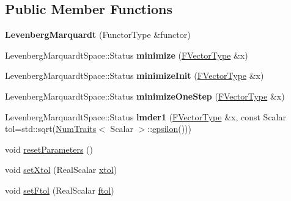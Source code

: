 \subsection*{Public Member Functions}
\begin{DoxyCompactItemize}
\item 
\mbox{\label{class_eigen_1_1_levenberg_marquardt_ac6f47b62a823190b3e28b3eb634e1cca}} 
{\bfseries Levenberg\+Marquardt} (Functor\+Type \&functor)
\item 
\mbox{\label{class_eigen_1_1_levenberg_marquardt_a5c1ef387601af15f7d2474165bb82865}} 
Levenberg\+Marquardt\+Space\+::\+Status {\bfseries minimize} (\hyperlink{group___core___module}{F\+Vector\+Type} \&x)
\item 
\mbox{\label{class_eigen_1_1_levenberg_marquardt_ad1b2467f6143a874e023416db0832810}} 
Levenberg\+Marquardt\+Space\+::\+Status {\bfseries minimize\+Init} (\hyperlink{group___core___module}{F\+Vector\+Type} \&x)
\item 
\mbox{\label{class_eigen_1_1_levenberg_marquardt_a1347316132f0bd7bf2541788d9e12637}} 
Levenberg\+Marquardt\+Space\+::\+Status {\bfseries minimize\+One\+Step} (\hyperlink{group___core___module}{F\+Vector\+Type} \&x)
\item 
\mbox{\label{class_eigen_1_1_levenberg_marquardt_a88cddb5e5cabffcf7a00f1c303e37652}} 
Levenberg\+Marquardt\+Space\+::\+Status {\bfseries lmder1} (\hyperlink{group___core___module}{F\+Vector\+Type} \&x, const Scalar tol=std\+::sqrt(\hyperlink{group___core___module_struct_eigen_1_1_num_traits}{Num\+Traits}$<$ Scalar $>$\+::\hyperlink{class_eigen_1_1_levenberg_marquardt_aac799068926ca0bc3387b2dc5c0eb113}{epsilon}()))
\item 
void \hyperlink{class_eigen_1_1_levenberg_marquardt_a16172a2048058ea0a908213a7b0f8971}{reset\+Parameters} ()
\item 
void \hyperlink{class_eigen_1_1_levenberg_marquardt_a691b571366630f1329d2de7a5e40e7a5}{set\+Xtol} (Real\+Scalar \hyperlink{class_eigen_1_1_levenberg_marquardt_a25a7629ea877d8f08670536b3d234897}{xtol})
\item 
void \hyperlink{class_eigen_1_1_levenberg_marquardt_a09c0852c6a4534b84a16ac5d9c631c12}{set\+Ftol} (Real\+Scalar \hyperlink{class_eigen_1_1_levenberg_marquardt_a957ac071ec775779bb03d10b463ddfbc}{ftol})

\end{DoxyCompactItemize}
